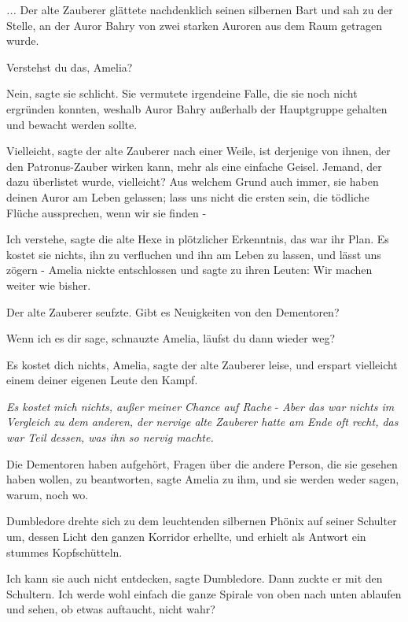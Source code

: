 \emph{...}
Der alte Zauberer glättete nachdenklich seinen silbernen Bart und sah zu der
Stelle, an der Auror Bahry von zwei starken Auroren aus dem Raum getragen wurde.

\glqq{}Verstehst du das, Amelia?\grqq{}

\glqq{}Nein\grqq{}, sagte sie schlicht. Sie vermutete irgendeine Falle, die sie
noch nicht ergründen konnten, weshalb Auror Bahry außerhalb der Hauptgruppe
gehalten und bewacht werden sollte.

\glqq{}Vielleicht\grqq{}, sagte der alte Zauberer nach einer Weile, \glqq{}ist
derjenige von ihnen, der den Patronus-Zauber wirken kann, mehr als eine einfache
Geisel. Jemand, der dazu überlistet wurde, vielleicht? Aus welchem Grund auch
immer, sie haben deinen Auror am Leben gelassen; lass uns nicht die ersten sein,
die tödliche Flüche aussprechen, wenn wir sie finden -\grqq{}

\glqq{}Ich verstehe\grqq{}, sagte die alte Hexe in plötzlicher Erkenntnis, \glqq{}
das war ihr Plan. Es kostet sie nichts, ihn zu verfluchen und ihn am Leben zu
lassen, und lässt uns zögern -\grqq{} Amelia nickte entschlossen und sagte zu
ihren Leuten: \glqq{}Wir machen weiter wie bisher.\grqq{}

Der alte Zauberer seufzte. \glqq{}Gibt es Neuigkeiten von den Dementoren?\grqq{}

\glqq{}Wenn ich es dir sage\grqq{}, schnauzte Amelia, \glqq{}läufst du dann wieder
weg?\grqq{}

\glqq{}Es kostet dich nichts, Amelia\grqq{}, sagte der alte Zauberer leise, \glqq{}
und erspart vielleicht einem deiner eigenen Leute den Kampf.\grqq{}

\emph{Es kostet mich nichts, außer meiner Chance auf Rache} - \emph{Aber das war
nichts im Vergleich zu dem anderen, der nervige alte Zauberer hatte am Ende oft
recht, das war Teil dessen, was ihn so nervig machte.}

\glqq{}Die Dementoren haben aufgehört, Fragen über die andere Person, die sie
gesehen haben wollen, zu beantworten\grqq{}, sagte Amelia zu ihm, \glqq{}und sie
werden weder sagen, warum, noch wo.\grqq{}

Dumbledore drehte sich zu dem leuchtenden silbernen Phönix auf seiner Schulter
um, dessen Licht den ganzen Korridor erhellte, und erhielt als Antwort ein
stummes Kopfschütteln.

\glqq{}Ich kann sie auch nicht entdecken\grqq{}, sagte Dumbledore. Dann zuckte er
mit den Schultern. \glqq{}Ich werde wohl einfach die ganze Spirale von oben nach
unten ablaufen und sehen, ob etwas auftaucht, nicht wahr?\grqq{}

